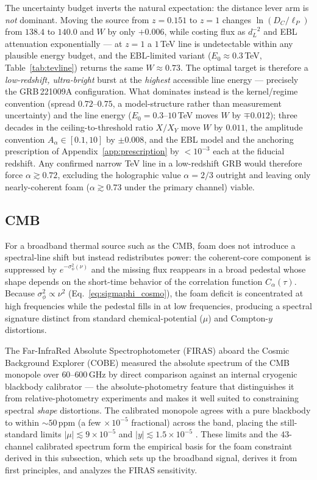\documentclass[aps,prd,onecolumn,amsmath,amssymb]{revtex4-2}
\begin{document}
The uncertainty budget inverts the natural expectation: the distance
lever arm is \emph{not} dominant.  Moving the source from $z=0.151$
to $z=1$ changes $\ln(D_C/\ell_P)$ from $138.4$ to $140.0$ and $W$ by
only $+0.006$, while costing flux as $d_L^{-2}$ and EBL attenuation
exponentially --- at $z=1$ a $1$\,TeV line is undetectable within any
plausible energy budget, and the EBL-limited variant
($E_0\approx0.3$\,TeV, Table~\ref{tab:tevline}) returns the same
$W\approx0.73$.  The optimal target is therefore a
\emph{low-redshift, ultra-bright} burst at the \emph{highest}
accessible line energy --- precisely the GRB\,221009A configuration.
What dominates instead is the kernel/regime convention (spread
$0.72$--$0.75$, a model-structure rather than measurement
uncertainty) and the line energy ($E_0=0.3$--$10$\,TeV moves $W$ by
$\mp0.012$); three decades in the ceiling-to-threshold ratio $X/X_Y$
move $W$ by $0.011$, the amplitude convention $A_\alpha\in[0.1,10]$
by $\pm0.008$, and the EBL model and the anchoring prescription of
Appendix~\ref{app:prescription} by $<10^{-3}$ each at the fiducial
redshift.  Any confirmed narrow TeV line in a low-redshift GRB would
therefore force $\alpha\gtrsim0.72$, excluding the holographic value
$\alpha=2/3$ outright and leaving only nearly-coherent foam
($\alpha\gtrsim0.73$ under the primary channel) viable.

\subsection{CMB}
\label{sec:CMB}

For a broadband thermal source such as the CMB, foam does not introduce
a spectral-line shift but instead redistributes power: the coherent-core
component is suppressed by $e^{-\sigma_\phi^2(\nu)}$ and the missing flux
reappears in a broad pedestal whose shape depends on the short-time
behavior of the correlation function $C_\alpha(\tau)$.  Because
$\sigma_\phi^2\propto\nu^2$ (Eq.~\eqref{eq:sigmaphi_cosmo}), the foam deficit
is concentrated at high frequencies while the pedestal fills in at low
frequencies, producing a spectral signature distinct from standard
chemical-potential ($\mu$) and Compton-$y$ distortions.

The Far-InfraRed Absolute Spectrophotometer (FIRAS) aboard the Cosmic
Background Explorer (COBE) measured the absolute spectrum of the CMB
monopole over $60$--$600$\,GHz by direct comparison against an internal
cryogenic blackbody calibrator --- the absolute-photometry feature that
distinguishes it from relative-photometry experiments and makes it
well suited to constraining spectral \emph{shape} distortions.  The
calibrated monopole agrees with a pure blackbody to within
$\sim 50$\,ppm (a few$\,\times10^{-5}$ fractional) across the band,
placing the still-standard limits $|\mu|\lesssim 9\times10^{-5}$ and
$|y|\lesssim 1.5\times10^{-5}$ \cite{Fixsen1996}.  These limits and the
$43$-channel calibrated spectrum form the empirical basis for the foam
constraint derived in this subsection, which sets up the broadband
signal, derives it from first principles, and analyzes the FIRAS
sensitivity.
\end{document}
